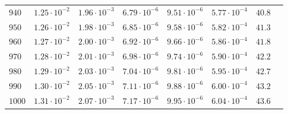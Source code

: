 \begin{table}
\begin{tabular}{lccccccc}
$940 $&$ 1.25\cdot 10^{-2} $&$ 1.96\cdot 10^{-3} $&$ 6.79\cdot 10^{-6} $&$ 9.51\cdot 10^{-6} $&$ 5.77\cdot 10^{-4} $&$ 40.8$\\
$950 $&$ 1.26\cdot 10^{-2} $&$ 1.98\cdot 10^{-3} $&$ 6.85\cdot 10^{-6} $&$ 9.58\cdot 10^{-6} $&$ 5.82\cdot 10^{-4} $&$ 41.3$\\
$960 $&$ 1.27\cdot 10^{-2} $&$ 2.00\cdot 10^{-3} $&$ 6.92\cdot 10^{-6} $&$ 9.66\cdot 10^{-6} $&$ 5.86\cdot 10^{-4} $&$ 41.8$\\
$970 $&$ 1.28\cdot 10^{-2} $&$ 2.01\cdot 10^{-3} $&$ 6.98\cdot 10^{-6} $&$ 9.74\cdot 10^{-6} $&$ 5.90\cdot 10^{-4} $&$ 42.2$\\
$980 $&$ 1.29\cdot 10^{-2} $&$ 2.03\cdot 10^{-3} $&$ 7.04\cdot 10^{-6} $&$ 9.81\cdot 10^{-6} $&$ 5.95\cdot 10^{-4} $&$ 42.7$\\
$990 $&$ 1.30\cdot 10^{-2} $&$ 2.05\cdot 10^{-3} $&$ 7.11\cdot 10^{-6} $&$ 9.88\cdot 10^{-6} $&$ 6.00\cdot 10^{-4} $&$ 43.2$\\
$1000 $&$ 1.31\cdot 10^{-2} $&$ 2.07\cdot 10^{-3} $&$ 7.17\cdot 10^{-6} $&$ 9.95\cdot 10^{-6} $&$ 6.04\cdot 10^{-4} $&$ 43.6$\\
\hline
  \end{tabular}
\end{table}

